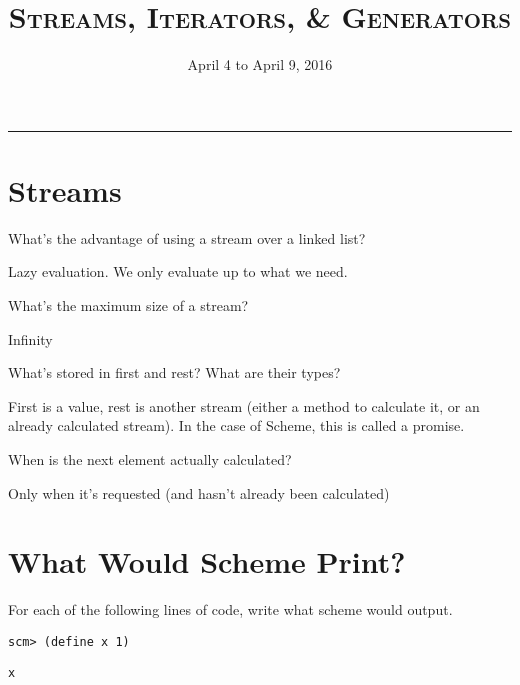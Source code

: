 \documentclass{exam}
\title{\textsc{Streams, Iterators, & Generators}}
\date{April 4 to April 9, 2016}
\begin{document}
\maketitle
\rule{\textwidth}{0.15em}
\fontsize{12}{15}\selectfont




\section{Streams}
\begin{questions}
\begin{blocksection}
\question What’s the advantage of using a stream over a linked list?
\begin{solution}[0.2in] 
Lazy evaluation. We only evaluate up to what we need.
\end{solution}

\quesiton What’s the maximum size of a stream?
\begin{solution}[0.2in]
Infinity
\end{solution}

\question What’s stored in first and rest? What are their types? 
\begin{solution}[0.2in]
First is a value, rest is another stream (either a method to calculate it, or an already calculated stream). In the case of Scheme, this is called a promise.
\end{solution}

\question When is the next element actually calculated?
\begin{solution}[.2in]
Only when it's requested (and hasn't already been calculated)
\end{solution}
\end{blocksection}

\section{What Would Scheme Print?}
\begin{blocksection}
\question For each of the following lines of code, write what scheme would output.

\begin{lstlisting}
scm> (define x 1)
\end{lstlisting}
\begin{solution}[.25in]
\texttt{x}
\end{solution}


\end{blocksection}
\end{questions}
\end{document}

